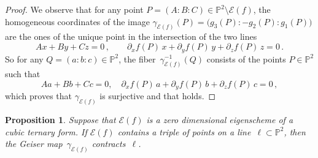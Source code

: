 \documentclass[a4paper, 11pt, reqno]{amsart}
\theoremstyle{plain}
\newtheorem{prop}[lemma]{Proposition}
\theoremstyle{definition}
\newcommand{\p}{\mathbb{P}}
\newcommand{\Eig}[1]{\mathcal{E}\!\left( {#1} \right)}
\begin{document}
\begin{proof}
We observe that for any point $P=(A:B:C) \in \p^2 \setminus \Eig{f}$, the homogeneous coordinates
of the image $\gamma_{\Eig{f}}(P) = \bigl( g_3(P): -g_2(P): g_1(P) \bigr)$ are the ones of the unique point in the intersection of the two lines
%
\[
  Ax + By+ Cz = 0 \,, \qquad
  \partial_x f(P) \, x + \partial_y f(P) \, y + \partial_z f(P) \, z = 0 \,.
\]
%
So for any $Q = (a:b:c) \in \p^2$, the fiber~$\gamma_{\Eig{f}}^{-1}(Q)$ consists of the points $P \in \p^2$ such that
%
\begin{equation}
\label{eq:polars}
  Aa + Bb+ Cc = 0, \quad
  \partial_x f(P) \, a + \partial_y f(P) \, b + \partial_z f(P) \, c = 0 \,,
\end{equation}
%
which proves that $\gamma_{\Eig{f}}$ is surjective and that  holds.
\end{proof}

\begin{prop}
\label{proposition:contract_aligned}
Suppose that $\Eig{f}$ is a zero dimensional eigenscheme of a cubic ternary form.
If $\Eig{f}$ contains a triple of points on a line~$\ell \subset \p^2$, then the Geiser map~$\gamma_{\Eig{f}}$ contracts~$\ell$.
\end{prop}
\end{document}
